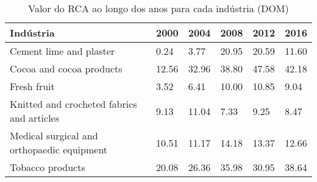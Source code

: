 \begin{table}
\centering
\caption{Valor do RCA ao longo dos anos para cada indústria (DOM)}
\label{tab:ex3-tempo-DOM}
\begin{tabular}{p{6cm}p{1.5cm}p{1.5cm}p{1.5cm}p{1.5cm}p{1.5cm}}
\toprule
                                 Indústria &  2000 &  2004 &  2008 &  2012 &  2016 \\
\midrule
                   Cement lime and plaster &  0.24 &  3.77 & 20.95 & 20.59 & 11.60 \\
                  Cocoa and cocoa products & 12.56 & 32.96 & 38.80 & 47.58 & 42.18 \\
                               Fresh fruit &  3.52 &  6.41 & 10.00 & 10.85 &  9.04 \\
Knitted and crocheted fabrics and articles &  9.13 & 11.04 &  7.33 &  9.25 &  8.47 \\
Medical surgical and orthopaedic equipment & 10.51 & 11.17 & 14.18 & 13.37 & 12.66 \\
                          Tobacco products & 20.08 & 26.36 & 35.98 & 30.95 & 38.64 \\
\bottomrule
\end{tabular}
\end{table}
